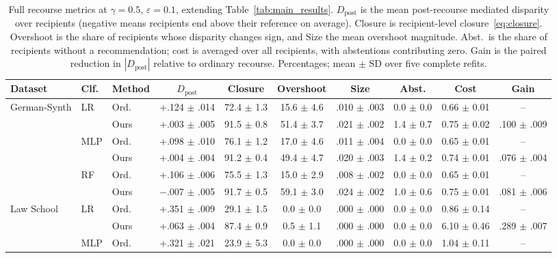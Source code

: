 \begin{table}[t]
\centering
\footnotesize
\caption{Full recourse metrics at $\gamma=0.5$, $\varepsilon=0.1$, extending
Table~\ref{tab:main_results}. $D_{\mathrm{post}}$ is the mean post-recourse
mediated disparity over recipients (negative means recipients end above
their reference on average). Closure is recipient-level
closure~\eqref{eq:closure}. Overshoot is the share of recipients whose disparity changes sign, and Size
the mean overshoot magnitude. Abst.\ is the share of recipients without a
recommendation; cost is averaged over all recipients, with abstentions
contributing zero. Gain is the paired reduction in $|D_{\mathrm{post}}|$
relative to ordinary recourse. Percentages; mean $\pm$ SD over five complete
refits.}
\label{tab:app_recourse}
\setlength{\tabcolsep}{3pt}
\begin{tabular}{lll ccccccc}
\hline
Dataset & Clf. & Method & $D_{\mathrm{post}}$ & Closure &
Overshoot & Size & Abst. & Cost & Gain \\
\hline
German-Synth & LR & Ord. & +.124 $\pm$ .014 & 72.4 $\pm$ 1.3 & 15.6 $\pm$ 4.6 & .010 $\pm$ .003 & 0.0 $\pm$ 0.0 & 0.66 $\pm$ 0.01 & -- \\
 &  & Ours & +.003 $\pm$ .005 & 91.5 $\pm$ 0.8 & 51.4 $\pm$ 3.7 & .021 $\pm$ .002 & 1.4 $\pm$ 0.7 & 0.75 $\pm$ 0.02 & .100 $\pm$ .009 \\
\cline{2-10}
 & MLP & Ord. & +.098 $\pm$ .010 & 76.1 $\pm$ 1.2 & 17.0 $\pm$ 4.6 & .011 $\pm$ .004 & 0.0 $\pm$ 0.0 & 0.65 $\pm$ 0.01 & -- \\
 &  & Ours & +.004 $\pm$ .004 & 91.2 $\pm$ 0.4 & 49.4 $\pm$ 4.7 & .020 $\pm$ .003 & 1.4 $\pm$ 0.2 & 0.74 $\pm$ 0.01 & .076 $\pm$ .004 \\
\cline{2-10}
 & RF & Ord. & +.106 $\pm$ .006 & 75.5 $\pm$ 1.3 & 15.0 $\pm$ 2.9 & .008 $\pm$ .002 & 0.0 $\pm$ 0.0 & 0.65 $\pm$ 0.01 & -- \\
 &  & Ours & $-$.007 $\pm$ .005 & 91.7 $\pm$ 0.5 & 59.1 $\pm$ 3.0 & .024 $\pm$ .002 & 1.0 $\pm$ 0.6 & 0.75 $\pm$ 0.01 & .081 $\pm$ .006 \\
\hline
Law School & LR & Ord. & +.351 $\pm$ .009 & 29.1 $\pm$ 1.5 & 0.0 $\pm$ 0.0 & .000 $\pm$ .000 & 0.0 $\pm$ 0.0 & 0.86 $\pm$ 0.14 & -- \\
 &  & Ours & +.063 $\pm$ .004 & 87.4 $\pm$ 0.9 & 0.5 $\pm$ 1.1 & .000 $\pm$ .000 & 0.0 $\pm$ 0.0 & 6.10 $\pm$ 0.46 & .289 $\pm$ .007 \\
\cline{2-10}
 & MLP & Ord. & +.321 $\pm$ .021 & 23.9 $\pm$ 5.3 & 0.0 $\pm$ 0.0 & .000 $\pm$ .000 & 0.0 $\pm$ 0.0 & 1.04 $\pm$ 0.11 & -- \\

\end{tabular}
\end{table}
